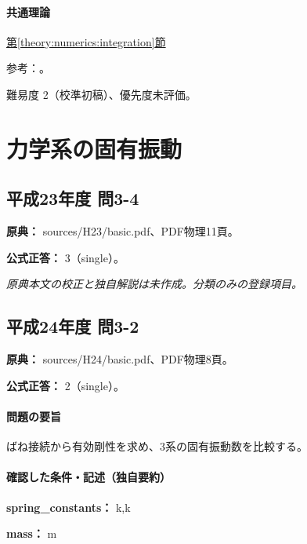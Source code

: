 \paragraph{共通理論} \hyperref[theory:numerics:integration]{第\ref*{theory:numerics:integration}節}

\par 参考：\cite{nist_quadrature}。

\par 難易度 2（校準初稿）、優先度未評価。

\section{力学系の固有振動}

\subsection{平成23年度 問3-4}
\label{q:h23-reg-basic-3-4}

\noindent\textbf{原典：} sources/H23/basic.pdf、PDF物理11頁。

\textbf{公式正答：} 3（single）。

\par\textit{原典本文の校正と独自解説は未作成。分類のみの登録項目。}

\subsection{平成24年度 問3-2}
\label{q:h24-reg-basic-3-2}

\noindent\textbf{原典：} sources/H24/basic.pdf、PDF物理8頁。

\textbf{公式正答：} 2（single）。

\paragraph{問題の要旨} ばね接続から有効剛性を求め、3系の固有振動数を比較する。

\paragraph{確認した条件・記述（独自要約）}\mbox{}\par

\noindent\textbf{spring\_constants：} k,k\par

\noindent\textbf{mass：} m\par

